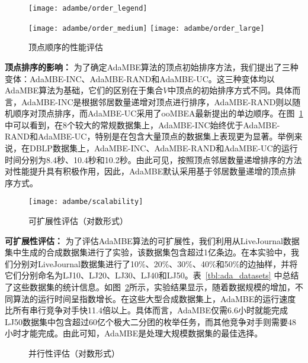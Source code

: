 \begin{figure} [H]
	\centering
	\vspace{0.1in}
  \texttt{[image: adambe/order\_legend]}
  

		\texttt{[image: adambe/order\_medium]}
  \quad
		\texttt{[image: adambe/order\_large]}

	\caption{顶点顺序的性能评估}
	\label{fig:ada_order}

\end{figure}

\textbf{顶点排序的影响：} 为了确定AdaMBE算法的顶点初始排序方法，我们提出了三种变体：AdaMBE-INC、AdaMBE-RAND和AdaMBE-UC。这三种变体均以AdaMBE算法为基础，它们的区别在于集合$V$中顶点的初始排序方式不同。具体而言，AdaMBE-INC是根据邻居数量递增对顶点进行排序，AdaMBE-RAND则以随机顺序对顶点排序，而AdaMBE-UC采用了ooMBEA最新提出的单边顺序。在图~\ref{fig:ada_order} 中可以看到，在8个较大的常规数据集上，AdaMBE-INC始终优于AdaMBE-RAND和AdaMBE-UC，特别是在包含大量顶点的数据集上表现更为显著。举例来说，在DBLP数据集上，AdaMBE-INC、AdaMBE-RAND和AdaMBE-UC的运行时间分别为8.4秒、10.4秒和10.2秒。由此可见，按照顶点邻居数量递增排序的方法对性能提升具有积极作用，因此，AdaMBE默认采用基于邻居数量递增的顶点排序方式。

\begin{figure} [t]
	\centering
		\vspace{0.1in}
		\texttt{[image: adambe/scalability]}
	\caption{可扩展性评估（对数形式）}
	\label{fig:ada_scalability}
\end{figure}



\textbf{可扩展性评估：} 为了评估AdaMBE算法的可扩展性，我们利用从LiveJournal数据集中生成的合成数据集进行了实验，该数据集包含超过1亿条边。在本实验中，我们分别对LiveJournal数据集进行了10\%、20\%、30\%、40\%和50\%的边抽样，并将它们分别命名为LJ10、LJ20、LJ30、LJ40和LJ50。表~\ref{tbl:ada_datasets} 中总结了这些数据集的统计信息。如图~\ref{fig:ada_scalability}所示，实验结果显示，随着数据规模的增加，不同算法的运行时间呈指数增长。在这些大型合成数据集上，AdaMBE的运行速度比所有串行竞争对手快11.4倍以上。具体而言，AdaMBE仅需6.6小时就能完成LJ50数据集中包含超过60亿个极大二分团的枚举任务，而其他竞争对手则需要48小时才能完成。由此可知，AdaMBE是处理大规模数据集的最佳选择。

\begin{figure} [H]
	\centering

  \quad

	\caption{并行性评估（对数形式）}
	\label{fig:ada_parallel}

\end{figure}

